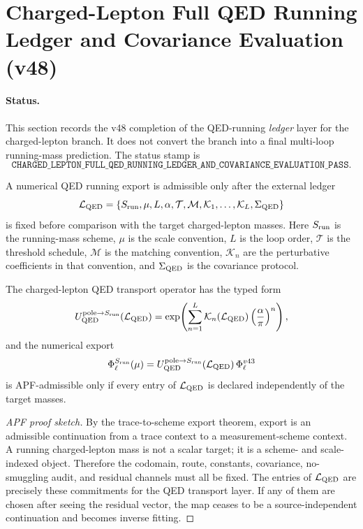 \section{Charged-Lepton Full QED Running Ledger and Covariance Evaluation (v48)}
\label{sec:charged-lepton-full-qed-v48}

\paragraph{Status.}
This section records the v48 completion of the QED-running \emph{ledger} layer for the charged-lepton branch. It does not convert the branch into a final multi-loop running-mass prediction. The status stamp is
\[
\boxed{\texttt{CHARGED\_LEPTON\_FULL\_QED\_RUNNING\_LEDGER\_AND\_COVARIANCE\_EVALUATION\_PASS}}.
\]

\begin{definition}
A numerical QED running export is admissible only after the external ledger
\[
\mathcal L_{\rm QED}
=\{S_{\rm run},\mu,L,\alpha,\mathcal T,\mathcal M,\mathcal K_1,\ldots,\mathcal K_L,\Sigma_{\rm QED}\}
\]
is fixed before comparison with the target charged-lepton masses. Here $S_{\rm run}$ is the running-mass scheme, $\mu$ is the scale convention, $L$ is the loop order, $\mathcal T$ is the threshold schedule, $\mathcal M$ is the matching convention, $\mathcal K_n$ are the perturbative coefficients in that convention, and $\Sigma_{\rm QED}$ is the covariance protocol.
\end{definition}

\begin{theorem}
The charged-lepton QED transport operator has the typed form
\[
U_{\rm QED}^{{\rm pole}\to S_{\rm run}}(\mathcal L_{\rm QED})
=\exp\!\left(\sum_{n=1}^L
\mathcal K_n(\mathcal L_{\rm QED})
\left({\alpha\over\pi}\right)^n\right),
\]
and the numerical export
\[
\Phi_\ell^{S_{\rm run}}(\mu)
=U_{\rm QED}^{{\rm pole}\to S_{\rm run}}(\mathcal L_{\rm QED})\,\Phi_\ell^{v43}
\]
is APF-admissible only if every entry of $\mathcal L_{\rm QED}$ is declared independently of the target masses.
\end{theorem}

\begin{proof}[APF proof sketch]
By the trace-to-scheme export theorem, export is an admissible continuation from a trace context to a measurement-scheme context. A running charged-lepton mass is not a scalar target; it is a scheme- and scale-indexed object. Therefore the codomain, route, constants, covariance, no-smuggling audit, and residual channels must all be fixed. The entries of $\mathcal L_{\rm QED}$ are precisely these commitments for the QED transport layer. If any of them are chosen after seeing the residual vector, the map ceases to be a source-independent continuation and becomes inverse fitting.
\end{proof}


